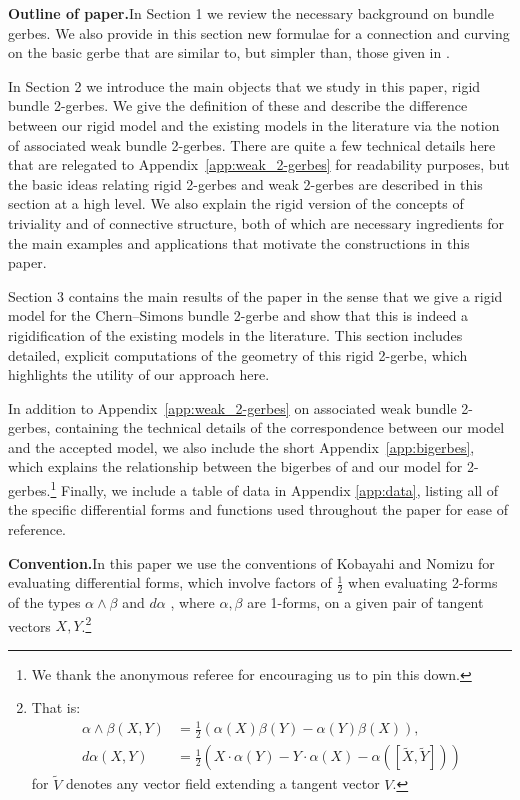 \documentclass[12pt]{amsart}
\theoremstyle{plain}
\theoremstyle{definition}
\theoremstyle{remark}
\numberwithin{equation}{section}
\newcommand{\<}{\langle}
\renewcommand{\>}{\rangle}
\begin{document}
\smallskip

\noindent \textbf{Outline of paper.}\quad  In Section 1 we review the necessary background on bundle gerbes. 
We also provide in this section new formulae for a connection and curving on the basic gerbe that are similar to, but simpler than, those given in \cite{MS03}.

In Section 2 we introduce the main objects that we study in this paper, rigid bundle 2-gerbes. 
We give the definition of these and describe the difference between our rigid model and the existing models in the literature via the notion of associated weak bundle 2-gerbes. 
There are quite a few technical details here that are relegated to Appendix~\ref{app:weak_2-gerbes} for readability purposes, but the basic ideas relating rigid 2-gerbes and weak 2-gerbes are described in this section at a high level. 
We also explain the rigid version of the concepts of triviality and of connective structure, both of which are necessary ingredients for the main examples and applications that motivate the constructions in this paper.

Section 3 contains the main results of the paper in the sense that we give a rigid model for the Chern--Simons bundle 2-gerbe and show that this is indeed a rigidification of the existing models in the literature. 
This section includes detailed, explicit computations of the geometry of this rigid 2-gerbe, which highlights the utility of our approach here. 

In addition to Appendix~\ref{app:weak_2-gerbes} on associated weak bundle 2-gerbes, containing the technical details of the correspondence between our model and the accepted model, we also include the short Appendix~\ref{app:bigerbes}, which explains the relationship between the bigerbes of \cite{KM19} and our model for 2-gerbes.\footnote{We thank the anonymous referee for encouraging us to pin this down.}
Finally, we include a table of data in Appendix \ref{app:data}, listing all of the specific differential forms and functions used throughout the paper for ease of reference.


\noindent \textbf{Convention.}\quad In this paper we use the conventions of Kobayahi and Nomizu for evaluating differential forms, which involve factors of $\frac12$ when evaluating 2-forms of the types $\alpha\wedge \beta$ \cite[page 35]{Kobayashi-Nomizu} and $d\alpha$ \cite[Proposition 3.11]{Kobayashi-Nomizu}, where $\alpha,\beta$ are 1-forms, on a given pair of tangent vectors $X,Y$.\footnote{That is:
\begin{align*}
    \alpha\wedge\beta(X,Y) &= \tfrac12(\alpha(X)\beta(Y) - \alpha(Y)\beta(X)),\\ 
    d\alpha(X,Y) & = \tfrac12(X\cdot \alpha(Y) - Y\cdot \alpha(X) - \alpha([\tilde X,\tilde Y]))
\end{align*}
for $\tilde V$ denotes any vector field extending a tangent vector $V$.}
\end{document}
